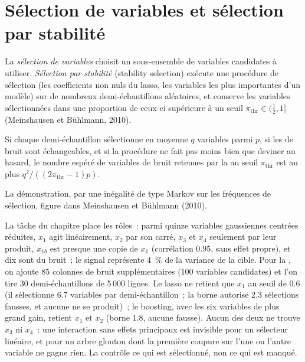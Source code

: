 \section{Sélection de variables et sélection par stabilité}

\begin{definition}\label{def:ml:feature-engineering-selection-and-importance:selection}
La \emph{sélection de variables} choisit un sous-ensemble de variables candidates à utiliser. \emph{Sélection par
stabilité} (stability selection) exécute une procédure de sélection (les coefficients non nuls du lasso, les variables les plus importantes d'un modèle)
sur de nombreux demi-échantillons aléatoires, et conserve les variables sélectionnées dans une proportion de ceux-ci supérieure à un seuil
$\pi_{\mathrm{thr}}\in(\frac12, 1]$ (Meinshausen et Bühlmann, 2010).
\end{definition}

\begin{theorem}\label{thm:ml:importance:mb}
Si chaque demi-échantillon sélectionne en moyenne $q$ variables parmi $p$, si les  de bruit sont échangeables, et si
la procédure ne fait pas moins bien que deviner au hasard, le nombre espéré de variables de bruit retenues par la  au seuil
$\pi_{\mathrm{thr}}$ est au plus $q^2/((2\pi_{\mathrm{thr}} - 1)p)$.
\end{theorem}

\admitted{} La démonstration, par une inégalité de type Markov sur les fréquences de sélection, figure dans Meinshausen et Bühlmann (2010).

La tâche du chapitre place les rôles~: parmi quinze variables gaussiennes centrées réduites, $x_1$ agit linéairement, $x_2$ par son carré,
$x_3$ et $x_4$ seulement par leur produit, $x_{1b}$ est presque une copie de $x_1$ (corrélation 0.95, sans effet propre), et dix sont du bruit~;
le signal représente 4~\% de la variance de la cible. Pour la , on ajoute 85 colonnes de bruit supplémentaires (100 variables candidates)
et l'on tire 30 demi-échantillons de 5\,000 lignes. Le lasso ne retient que $x_1$ au seuil de 0.6 (il sélectionne 6.7 variables par demi-échantillon~; la borne autorise 2.3 sélections fausses, et aucune ne se produit)~;
le boosting, avec les six variables de plus grand gain, retient $x_1$ et $x_2$ (borne 1.8, aucune fausse). Aucun des deux ne trouve $x_3$
ni $x_4$~: une interaction sans effets principaux est invisible pour un sélecteur linéaire,
et pour un arbre glouton dont la première coupure sur l'une ou l'autre variable ne gagne rien.
La  contrôle ce qui est sélectionné, non ce qui est manqué.

